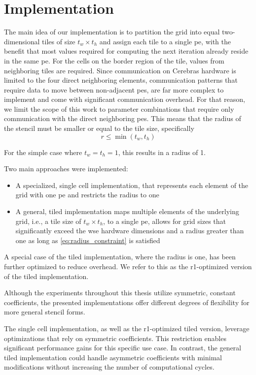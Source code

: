 \chapter{Implementation}
\label{sec:implementation}
The main idea of our implementation is to partition the grid into equal two-dimensional tiles of size $t_w \times t_h$ and assign each tile to a single \ac{pe}, with the benefit that most values required for computing the next iteration already reside in the same \ac{pe}. For the cells on the border region of the tile, values from neighboring tiles are required. Since communication on Cerebras hardware is limited to the four direct neighboring elements, communication patterns that require data to move between non-adjacent \acp{pe}, are far more complex to implement and come with significant communication overhead. For that reason, we limit the scope of this work to parameter combinations that require only communication with the direct neighboring \acp{pe}. This means that the radius of the stencil must be smaller or equal to the tile size, specifically
\begin{equation}    
\label{eq:radius_constraint}
r \leq \min(t_w, t_h)
\end{equation}

For the simple case where $t_w=t_h=1$, this results in a radius of 1.

Two main approaches were implemented:
\begin{itemize}
    \item A specialized, single cell implementation, that represents each element of the grid with one \ac{pe} and restricts the radius to one
    \item A general, tiled implementation maps multiple elements of the underlying grid, i.e., a tile size of $t_w \times t_h$, to a single \ac{pe}, allows for grid sizes that significantly exceed the \ac{wse} hardware dimensions and a radius greater than one as long as \autoref{eq:radius_constraint} is satisfied 
\end{itemize}

A special case of the tiled implementation, where the radius is one, has been further optimized to reduce overhead. We refer to this as the r1-optimized version of the tiled implementation. 

Although the experiments throughout this thesis utilize symmetric, constant coefficients, the presented implementations offer different degrees of flexibility for more general stencil forms.

The single cell implementation, as well as the r1-optimized tiled version, leverage optimizations that rely on symmetric coefficients. This restriction enables significant performance gains for this specific use case. In contrast, the general tiled implementation could handle asymmetric coefficients with minimal modifications without increasing the number of computational cycles.

